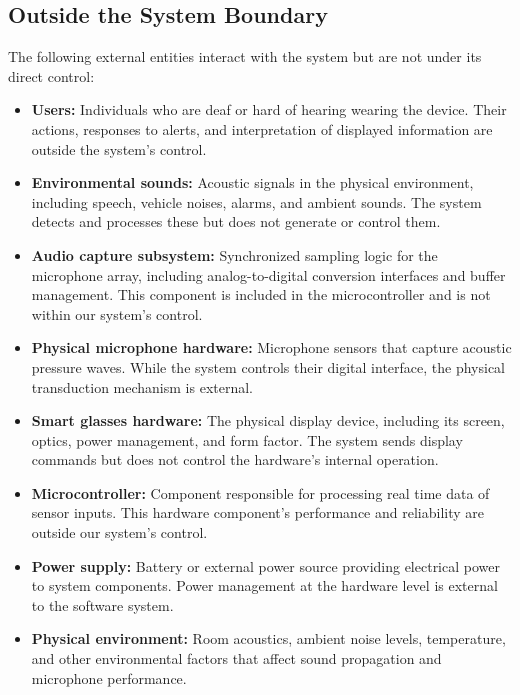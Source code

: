 \documentclass{article}
\begin{document}
\subsection{Outside the System Boundary}

The following external entities interact with the system but are not under its
direct control:

\begin{itemize}
\item \textbf{Users:} Individuals who are deaf or hard of hearing wearing the
device. Their actions, responses to alerts, and interpretation of displayed
information are outside the system's control.

\item \textbf{Environmental sounds:} Acoustic signals in the physical
environment, including speech, vehicle noises, alarms, and ambient sounds. The
system detects and processes these but does not generate or control them.

\item \textbf{Audio capture subsystem:} Synchronized sampling logic for the
microphone array, including analog-to-digital conversion interfaces and buffer
management. This component is included in the microcontroller and is not within
our system's control.

\item \textbf{Physical microphone hardware:} Microphone sensors that capture
acoustic pressure waves. While the system controls their digital interface, the
physical transduction mechanism is external.

\item \textbf{Smart glasses hardware:} The physical display device, including
its screen, optics, power management, and form factor. The system sends display
commands but does not control the hardware's internal operation.

\item \textbf{Microcontroller:} \label{comp:microcontroller} Component
responsible for processing real time data of sensor inputs. This hardware
component's performance and reliability are outside our system's control.

\item \textbf{Power supply:} Battery or external power source providing
electrical power to system components. Power management at the hardware level is
external to the software system.

\item \textbf{Physical environment:} Room acoustics, ambient noise levels,
temperature, and other environmental factors that affect sound propagation and
microphone performance.
\end{itemize}
\end{document}
